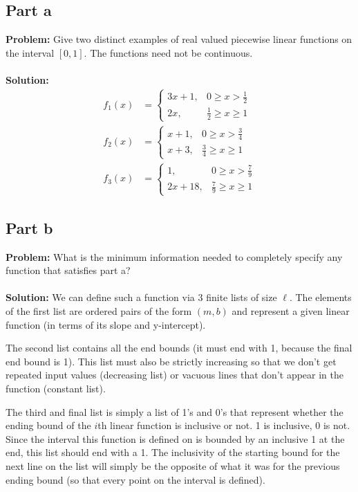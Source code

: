 \documentclass{article}
\begin{document}
\subsection{Part a}
\textbf{Problem:} Give two distinct examples of real valued piecewise linear functions on the interval $[0,1]$. The functions need not be continuous.
\\\\
\textbf{Solution:}
\begin{align*}
  f_1(x)&=
\begin{cases}
3x+1, &0\ge x>\frac{1}{2}\\
2x, &\frac{1}{2}\ge x\ge 1
\end{cases}\\
  f_2(x)&=
\begin{cases}
x+1, &0\ge x>\frac{3}{4}\\
x+3, &\frac{3}{4}\ge x\ge 1
\end{cases}\\
  f_3(x)&=
\begin{cases}
1, &0\ge x>\frac{7}{9}\\
2x+18, &\frac{7}{9}\ge x\ge 1
\end{cases}
\end{align*}

\subsection{Part b}
\textbf{Problem:} What is the minimum information needed to completely specify any function that satisfies part a?
\\\\
\textbf{Solution:} We can define such a function via 3 finite lists of size $\ell$. The elements of the first list are ordered pairs of the form $(m,b)$ and represent a given linear function (in terms of its slope and y-intercept).

The second list contains all the end bounds (it must end with 1, because the final end bound is 1). This list must also be strictly increasing so that we don't get repeated input values (decreasing list) or vacuous lines that don't appear in the function (constant list).

The third and final list is simply a list of 1's and 0's that represent whether the ending bound of the $i$th linear function is inclusive or not. 1 is inclusive, 0 is not. Since the interval this function is defined on is bounded by an inclusive 1 at the end, this list should end with a 1. The inclusivity of the starting bound for the next line on the list will simply be the opposite of what it was for the previous ending bound (so that every point on the interval is defined).
\end{document}

